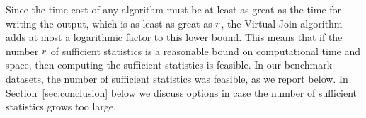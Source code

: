 \documentclass{acm_proc_article-sp}
\newcommand{\ct}{\mathit{ct}}
\begin{document}
Since the time cost of any algorithm must be at least as great as the time for writing the output, which is as least as great as $r$, 
the Virtual Join algorithm adds at most a logarithmic factor to this lower bound. 
This means that
if the number $r$ of sufficient statistics is a reasonable bound on computational time and space, then computing the sufficient statistics is feasible. In our benchmark datasets, the number of sufficient statistics was feasible, as we report below. 
In Section~\ref{sec:conclusion} below we discuss options in case the number of sufficient statistics  grows too large.
%
%





\end{document}
